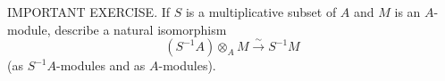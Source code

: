 IMPORTANT EXERCISE. If $S$ is a multiplicative subset of $A$ and $M$ is an $A$-module, describe a natural isomorphism
$$(S^{-1}A)\otimes_A M\xrightarrow{\sim}S^{-1}M$$
(as $S^{-1}A$-modules and as $A$-modules).
